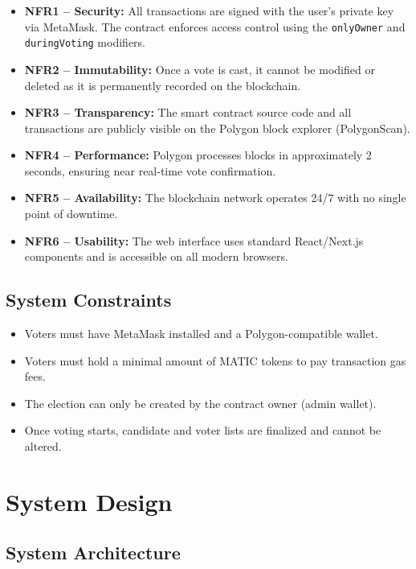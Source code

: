 \documentclass[12pt,a4paper]{report}
\begin{document}
\begin{itemize}
\item \textbf{NFR1 -- Security:} All transactions are signed with the user's private key
      via MetaMask. The contract enforces access control using the \texttt{onlyOwner}
      and \texttt{duringVoting} modifiers.
\item \textbf{NFR2 -- Immutability:} Once a vote is cast, it cannot be modified or
      deleted as it is permanently recorded on the blockchain.
\item \textbf{NFR3 -- Transparency:} The smart contract source code and all transactions
      are publicly visible on the Polygon block explorer (PolygonScan).
\item \textbf{NFR4 -- Performance:} Polygon processes blocks in approximately 2 seconds,
      ensuring near real-time vote confirmation.
\item \textbf{NFR5 -- Availability:} The blockchain network operates 24/7 with no
      single point of downtime.
\item \textbf{NFR6 -- Usability:} The web interface uses standard React/Next.js
      components and is accessible on all modern browsers.
\end{itemize}

\section{System Constraints}

\begin{itemize}
\item Voters must have MetaMask installed and a Polygon-compatible wallet.
\item Voters must hold a minimal amount of MATIC tokens to pay transaction gas fees.
\item The election can only be created by the contract owner (admin wallet).
\item Once voting starts, candidate and voter lists are finalized and cannot be altered.
\end{itemize}

\chapter{System Design}

\section{System Architecture}
\end{document}

